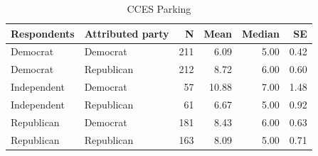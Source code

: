 \begin{table}[ht]
\centering
\caption{CCES Parking}
\label{tab:parking_sum_cces}
\begin{tabular}{llrrrr}
  \toprule
Respondents & Attributed party & N & Mean & Median & SE \\
  \midrule
Democrat & Democrat & 211 & 6.09 & 5.00 & 0.42 \\
  Democrat & Republican & 212 & 8.72 & 6.00 & 0.60 \\
  Independent & Democrat &  57 & 10.88 & 7.00 & 1.48 \\
  Independent & Republican &  61 & 6.67 & 5.00 & 0.92 \\
  Republican & Democrat & 181 & 8.43 & 6.00 & 0.63 \\
  Republican & Republican & 163 & 8.09 & 5.00 & 0.71 \\
   \bottomrule
\end{tabular}
\end{table}
